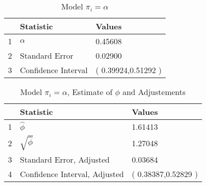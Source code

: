 \documentclass[12pt, letterpaper]{article}
\begin{document}
\begin{table}[ht]
	\centering
	\caption{Model $\pi_i = \alpha$} 
	\begin{tabular}{lll}
		\hline
		& Statistic & Values \\ 
		\hline
		1 & $\alpha$ & 0.45608 \\ 
		2 & Standard Error & 0.02900 \\ 
		3 & Confidence Interval & ( 0.39924,0.51292 ) \\ 
		\hline
	\end{tabular}
\end{table}

\begin{table}[ht]
	\centering
	\caption{Model $\pi_i = \alpha$, Estimate of $\phi$ and Adjustements} 
	\begin{tabular}{lll}
		\hline
		& Statistic & Values \\ 
		\hline
		1 & $\hat{\phi}$ & 1.61413 \\ 
		2 & $\sqrt \hat{\phi}$ & 1.27048 \\ 
		3 & Standard Error, Adjusted & 0.03684 \\ 
		4 & Confidence Interval, Adjusted & ( 0.38387,0.52829 ) \\ 
		\hline
	\end{tabular}
\end{table}
\end{document}
